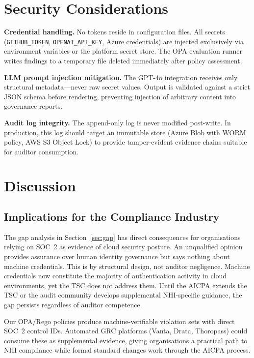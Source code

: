 \documentclass[journal]{IEEEtran}
\begin{document}
\section{Security Considerations}
\label{sec:security}

\textbf{Credential handling.} No tokens reside in configuration files. All secrets (\texttt{GITHUB\_TOKEN}, \texttt{OPENAI\_API\_KEY}, Azure credentials) are injected exclusively via environment variables or the platform secret store. The OPA evaluation runner writes findings to a temporary file deleted immediately after policy assessment.

\textbf{LLM prompt injection mitigation.} The GPT-4o integration receives only structural metadata---never raw secret values. Output is validated against a strict JSON schema before rendering, preventing injection of arbitrary content into governance reports.

\textbf{Audit log integrity.} The append-only log is never modified post-write. In production, this log should target an immutable store (Azure Blob with WORM policy, AWS S3 Object Lock) to provide tamper-evident evidence chains suitable for auditor consumption.

\section{Discussion}
\label{sec:discussion}

\subsection{Implications for the Compliance Industry}

The gap analysis in Section~\ref{sec:gap} has direct consequences for organisations relying on SOC~2 as evidence of cloud security posture. An unqualified opinion provides assurance over human identity governance but says nothing about machine credentials. This is by structural design, not auditor negligence. Machine credentials now constitute the majority of authentication activity in cloud environments, yet the TSC does not address them. Until the AICPA extends the TSC or the audit community develops supplemental NHI-specific guidance, the gap persists regardless of auditor competence.

Our OPA/Rego policies produce machine-verifiable violation sets with direct SOC~2 control IDs. Automated GRC platforms (Vanta, Drata, Thoropass) could consume these as supplemental evidence, giving organisations a practical path to NHI compliance while formal standard changes work through the AICPA process.
\end{document}
